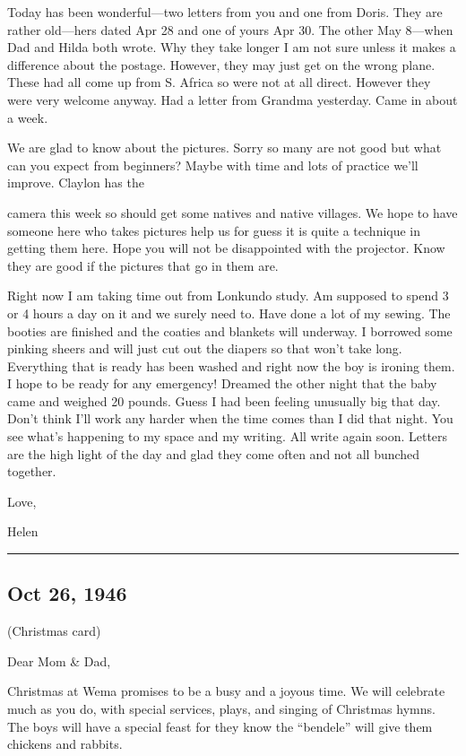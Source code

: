 \documentclass[
]{book}
\begin{document}
Today has been wonderful---two letters from you and one from Doris. They are rather old---hers dated Apr 28 and one of yours Apr 30. The other May 8---when Dad and Hilda both wrote. Why they take longer I am not sure unless it makes a difference about the postage. However, they may just get on the wrong plane. These had all come up from S. Africa so were not at all direct. However they were very welcome anyway. Had a letter from Grandma yesterday. Came in about a week.

We are glad to know about the pictures. Sorry so many are not good but what can you expect from beginners? Maybe with time and lots of practice we'll improve. Claylon has the

camera this week so should get some natives and native villages. We hope to have someone here who takes pictures help us for guess it is quite a technique in getting them here. Hope you will not be disappointed with the projector. Know they are good if the pictures that go in them are.

Right now I am taking time out from Lonkundo study. Am supposed to spend 3 or 4 hours a day on it and we surely need to. Have done a lot of my sewing. The booties are finished and the coaties and blankets will underway. I borrowed some pinking sheers and will just cut out the diapers so that won't take long. Everything that is ready has been washed and right now the boy is ironing them. I hope to be ready for any emergency! Dreamed the other night that the baby came and weighed 20 pounds. Guess I had been feeling unusually big that day. Don't think I'll work any harder when the time comes than I did that night. You see what's happening to my space and my writing. All write again soon. Letters are the high light of the day and glad they come often and not all bunched together.

Love,

Helen

\begin{center}\rule{0.5\linewidth}{0.5pt}\end{center}

\hypertarget{oct-26-1946}{%
\subsection{Oct 26, 1946}\label{oct-26-1946}}

(Christmas card)

Dear Mom \& Dad,

Christmas at Wema promises to be a busy and a joyous time. We will celebrate much as you do, with special services, plays, and singing of Christmas hymns. The boys will have a special feast for they know the ``bendele'' will give them chickens and rabbits.
\end{document}
